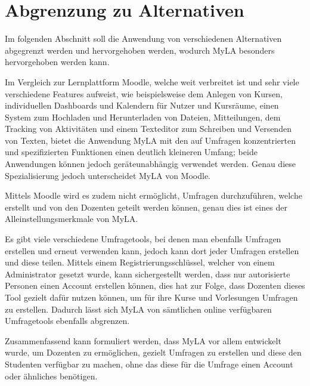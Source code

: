 \section{Abgrenzung zu Alternativen}
Im folgenden Abschnitt soll die Anwendung von verschiedenen Alternativen abgegrenzt werden und hervorgehoben werden, wodurch MyLA besonders hervorgehoben werden kann.

Im Vergleich zur Lernplattform Moodle, welche weit verbreitet ist und sehr viele verschiedene Features aufweist, wie beispielsweise dem Anlegen von Kursen, individuellen Dashboards und Kalendern für Nutzer und Kursräume, einen System zum Hochladen und Herunterladen von Dateien, Mitteilungen, dem Tracking von Aktivitäten und einem Texteditor zum Schreiben und Versenden von Texten, bietet die Anwendung MyLA mit den auf Umfragen konzentrierten und spezifizierten Funktionen einen deutlich kleineren Umfang; beide Anwendungen können jedoch geräteunabhängig verwendet werden\autocite[Vgl.][]{jr-moodle-features}.
Genau diese Spezialisierung jedoch unterscheidet MyLA von Moodle.

Mittels Moodle wird es zudem nicht ermöglicht, Umfragen durchzuführen, welche erstellt und von den Dozenten geteilt werden können, genau dies ist eines der Alleinstellungsmerkmale von MyLA.

Es gibt viele verschiedene Umfragetools, bei denen man ebenfalls Umfragen erstellen und erneut verwenden kann, jedoch kann dort jeder Umfragen erstellen und diese teilen.
Mittels einem Registrierungsschlüssel, welcher von einem Administrator gesetzt wurde, kann sichergestellt werden, dass nur autorisierte Personen einen Account erstellen können, dies hat zur Folge, dass Dozenten dieses Tool gezielt dafür nutzen können, um für ihre Kurse und Vorlesungen Umfragen zu erstellen.
Dadurch lässt sich MyLA von sämtlichen online verfügbaren Umfragetools ebenfalls abgrenzen. 

Zusammenfassend kann formuliert werden, dass MyLA vor allem entwickelt wurde, um Dozenten zu ermöglichen, gezielt Umfragen zu erstellen und diese den Studenten verfügbar zu machen, ohne das diese für die Umfrage einen Account oder ähnliches benötigen.
